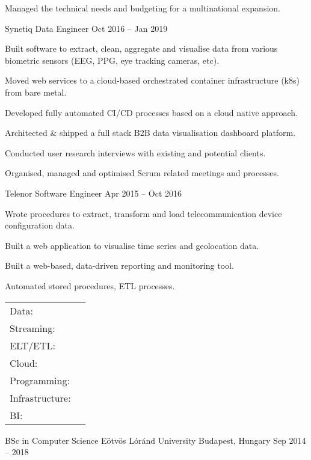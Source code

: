 \documentclass[]{awesome-cv}
\begin{document}
\begin{cventries}
{\begin{cvitems}
		\item {Managed the technical needs and budgeting for a multinational expansion.}
		\end{cvitems}}
	\cventry
	{Synetiq}
	{Data Engineer}
	{Oct 2016 – Jan 2019}
	{}
	{\begin{cvitems}
		\item {Built software to extract, clean, aggregate and visualise data from various biometric sensors (EEG, PPG, eye tracking cameras, etc).}
		\item {Moved web services to a cloud-based orchestrated container infrastructure (k8s) from bare metal.}
		\item {Developed fully automated CI/CD processes based on a cloud native approach.}
		\item {Architected \& shipped a full stack B2B data visualisation dashboard platform.}
		\item {Conducted user research interviews with existing and potential clients.}
		\item {Organised, managed and optimised Scrum related meetings and processes.}
		\end{cvitems}}
	\cventry
	{Telenor}
	{Software Engineer}
	{Apr 2015 – Oct 2016}
	{}
	{\begin{cvitems}
		\item {Wrote procedures to extract, transform and load telecommunication device configuration data.}
		\item {Built a web application to visualise time series and geolocation data.}
		\item {Built a web-based, data-driven reporting and monitoring tool.}
		\item {Automated stored procedures, ETL processes.}
		\end{cvitems}}
\end{cventries}
\begin{cventries}
	\cventry
	{}
	{\def\arraystretch{1.15}{\begin{tabular}{ l l }
		Data: & {\skill{ Snowflake, BigQuery, Databricks, Redshift, SQL}} \\
		Streaming: & {\skill{ Kafka, Redpanda, Debezium, CDC, Materialize}} \\
		ELT/ETL: & {\skill{ dbt, Airflow, Fivetran, Meltano }} \\ 
		Cloud:  & {\skill{ GCP/AWS, Composer, GKE, Cloud Functions, Cloud Build, Pub/Sub, GCS, SNS, SQS, EKS. }} \\
		Programming:  & {\skill{ Python (pandas, luigi, scikit, FastAPI, Meltano, etc.), Go, shell scripting, HTML/JS/CSS3 }} \\
		Infrastructure:  & {\skill{ Terraform, Docker, Kubernetes, CI/CD, Google Cloud Platform, GNU/Linux }} \\
		BI: & {\skill{ Looker, Data Studio, Streamlit }} \\
		\end{tabular}}}
	{}
	{}
	{}
\end{cventries}

\begin{cventries}
	\cventry
	{BSc in Computer Science}
	{Eötvös Lóránd University}
	{Budapest, Hungary}
	{Sep 2014 – 2018}
	{}
\end{cventries}

\vspace{-2mm}
\ 
\end{document}
